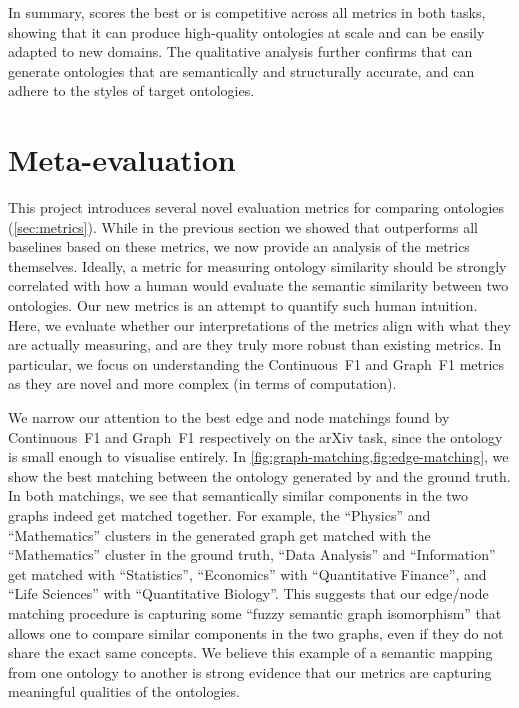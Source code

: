 In summary, \name scores the best or is competitive across all metrics in both tasks, showing that it can produce high-quality ontologies at scale and can be easily adapted to new domains. The qualitative analysis further confirms that \name can generate ontologies that are semantically and structurally accurate, and can adhere to the styles of target ontologies.

\section{Meta-evaluation}

This project introduces several novel evaluation metrics for comparing ontologies (\cref{sec:metrics}). While in the previous section we showed that \name outperforms all baselines based on these metrics, we now provide an analysis of the metrics themselves. Ideally, a metric for measuring ontology similarity should be strongly correlated with how a human would evaluate the semantic similarity between two ontologies. Our new metrics is an attempt to quantify such human intuition. Here, we evaluate whether our interpretations of the metrics align with what they are actually measuring, and are they truly more robust than existing metrics. In particular, we focus on understanding the Continuous~F1 and Graph~F1 metrics as they are novel and more complex (in terms of computation).

We narrow our attention to the best edge and node matchings found by Continuous~F1 and Graph~F1 respectively on the arXiv task, since the ontology is small enough to visualise entirely. In \cref{fig:graph-matching,fig:edge-matching}, we show the best matching between the ontology generated by \name and the ground truth. In both matchings, we see that semantically similar components in the two graphs indeed get matched together. For example, the ``Physics'' and ``Mathematics'' clusters in the generated graph get matched with the ``Mathematics'' cluster in the ground truth, ``Data Analysis'' and ``Information'' get matched with ``Statistics'', ``Economics'' with ``Quantitative Finance'', and ``Life Sciences'' with ``Quantitative Biology''. This suggests that our edge/node matching procedure is capturing some ``fuzzy semantic graph isomorphism'' that allows one to compare similar components in the two graphs, even if they do not share the exact same concepts. We believe this example of a semantic mapping from one ontology to another is strong evidence that our metrics are capturing meaningful qualities of the ontologies.

